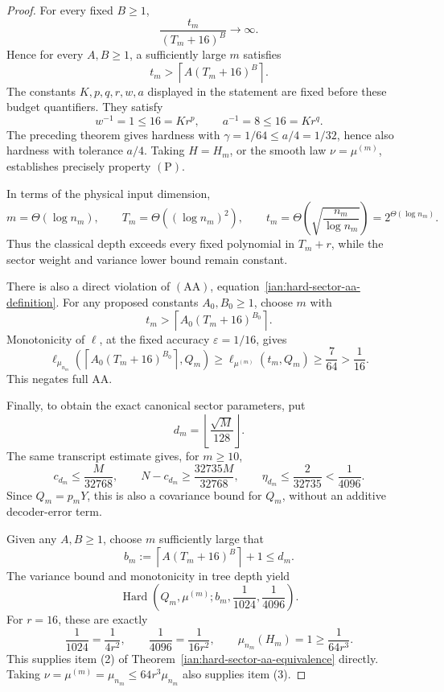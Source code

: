 \begin{proof}
For every fixed \(B\ge1\),
\[
 \frac{t_m}{(T_m+16)^B}\longrightarrow\infty.
\]
Hence for every \(A,B\ge1\), a sufficiently large \(m\) satisfies
\[
 t_m>\left\lceil A(T_m+16)^B\right\rceil.
\]
The constants \(K,p,q,r,w,a\) displayed in the statement are fixed before these budget quantifiers. They satisfy
\[
 w^{-1}=1\le16=Kr^p,
 \qquad
 a^{-1}=8\le16=Kr^q.
\]
The preceding theorem gives hardness with
\(\gamma=1/64\le a/4=1/32\), hence also hardness with tolerance \(a/4\).
Taking \(H=H_m\), or the smooth law \(\nu=\mu^{(m)}\), establishes precisely property \(\mathrm{(P)}\).

In terms of the physical input dimension,
\[
 m=\Theta(\log n_m),\qquad
 T_m=\Theta((\log n_m)^2),\qquad
 t_m=\Theta\!\left(\sqrt{\frac{n_m}{\log n_m}}\right)
     =2^{\Theta(\log n_m)}.
\]
Thus the classical depth exceeds every fixed polynomial in \(T_m+r\), while the sector weight and variance lower bound remain constant.

There is also a direct violation of \(\mathrm{(AA)}\),
equation~\eqref{ian:hard-sector-aa-definition}.
For any proposed constants \(A_0,B_0\ge1\), choose \(m\) with
\[
 t_m>\left\lceil A_0(T_m+16)^{B_0}\right\rceil.
\]
Monotonicity of \(\ell\), at the fixed accuracy \(\varepsilon=1/16\), gives
\[
 \ell_{\mu_{n_m}}
 \left(\left\lceil A_0(T_m+16)^{B_0}\right\rceil,Q_m\right)
 \ge\ell_{\mu^{(m)}}(t_m,Q_m)
 \ge\frac7{64}>\frac1{16}.
\]
This negates full AA.

Finally, to obtain the exact canonical sector parameters, put
\[
 d_m=\left\lfloor\frac{\sqrt M}{128}\right\rfloor.
\]
The same transcript estimate gives, for \(m\ge10\),
\[
 c_{d_m}\le\frac M{32768},
 \qquad
 N-c_{d_m}\ge\frac{32735M}{32768},
 \qquad
 \eta_{d_m}\le\frac2{32735}<\frac1{4096}.
\]
Since \(Q_m=p_mY\), this is also a covariance bound for \(Q_m\), without an additive decoder-error term.

Given any \(A,B\ge1\), choose \(m\) sufficiently large that
\[
 b_m:=\left\lceil A(T_m+16)^B\right\rceil+1\le d_m.
\]
The variance bound and monotonicity in tree depth yield
\[
 \operatorname{Hard}
 \left(Q_m,\mu^{(m)};b_m,\frac1{1024},\frac1{4096}\right).
\]
For \(r=16\), these are exactly
\[
 \frac1{1024}=\frac1{4r^2},
 \qquad
 \frac1{4096}=\frac1{16r^2},
 \qquad
 \mu_{n_m}(H_m)=1\ge\frac1{64r^3}.
\]
This supplies item (2) of
Theorem~\ref{ian:hard-sector-aa-equivalence} directly. Taking
\(\nu=\mu^{(m)}=\mu_{n_m}\le64r^3\mu_{n_m}\) also supplies item (3).
\end{proof}

